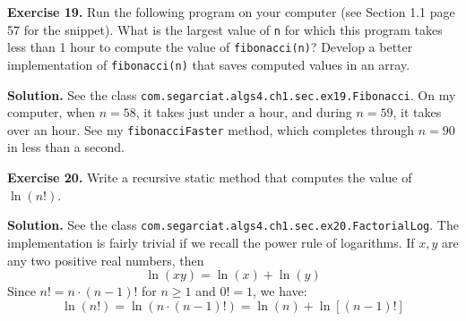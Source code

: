 \documentclass[12pt, a4paper]{article}
\newenvironment{ex}[2][Exercise]
{\par\medskip\noindent \textbf{#1 #2.}}
{\medskip}
\newenvironment{sol}[1][Solution]
{\par\medskip\noindent \textbf{#1.} }
{\medskip}
\begin{document}
	\begin{ex}{19}
		Run the following program on your computer (see Section 1.1 page 57 for the
		snippet). What is the largest value of \texttt{n} for which this program takes
		less than 1 hour to compute the value of \texttt{fibonacci(n)}? Develop a better
		implementation of \texttt{fibonacci(n)} that saves computed values in an array.
	\end{ex}
	\begin{sol}
		See the class \texttt{com.segarciat.algs4.ch1.sec.ex19.Fibonacci}. On my computer,
		when $n=58$, it takes just under a hour, and during $n=59$, it takes over an hour.
		See my \texttt{fibonacciFaster} method, which completes through $n=90$ in less than a
		second.
	\end{sol}
	\begin{ex}{20}
		Write a recursive static method that computes the value of $\ln (n!)$.
	\end{ex}
	\begin{sol}
		See the class \texttt{com.segarciat.algs4.ch1.sec.ex20.FactorialLog}.
		The implementation is fairly trivial if we recall the power rule of logarithms.
		If $x,y$ are any two positive real numbers, then
		\[
		\ln(xy) = \ln(x) + \ln(y)
		\]
		Since $n!=n\cdot (n-1)!$ for $n\geq 1$ and $0!=1$, we have:
		\[
		\ln(n!) = \ln(n\cdot (n-1)!) = \ln(n) + \ln[(n-1)!]
		\]
	\end{sol}
\end{document}
